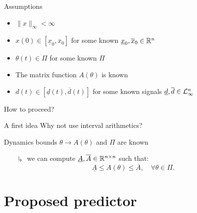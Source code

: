 \documentclass[slideopt,A4,showboxes,svgnames]{beamer}
\begin{document}
\begin{frame}{Assumptions}
\begin{assumption}
	\begin{itemize}
		\item $\|x\|_{\infty} < \infty$
		\item $x(0)\in[\underline{x}_{0},\overline{x}_{0}]$ for some \alert{known} $\underline{x}_{0},\overline{x}_{0}\in\mathbb{R}^{n}$
	\end{itemize}
\end{assumption}
\begin{assumption}
	\begin{itemize}
		\item $\theta(t)\in\Pi$ for some \alert{known} $\Pi$
		\item The matrix function $A(\theta)$ is \alert{known}
	\end{itemize}
	\end{assumption}
\begin{assumption}
	\begin{itemize}
		\item $d(t)\in[\underline{d}(t),\overline{d}(t)]$ for some \alert{known} signals $\underline{d},\overline{d}\in\mathcal{L}_{\infty}^{n}$
	\end{itemize}
\end{assumption}

\begin{flushright}
	How to proceed?
\end{flushright}
\end{frame}

\begin{frame}{A first idea}
Why not use \alert{interval arithmetics}?
\begin{exampleblock}{Dynamics bounds}
	$\theta\rightarrow A(\theta)$ and $\Pi$ are known
	\begin{itemize}
		\item[$\drsh$] we can compute $\underline{A},\overline{A}\in\mathbb{R}^{n\times n}$ such that:
		\[
		\underline{A}\leq A(\theta)\leq\overline{A},\quad\forall\theta\in\Pi.
		\]
	\end{itemize} 
\end{exampleblock}
\end{frame}


\section{Proposed predictor}
\frame{\sectionpage}
\end{document}
